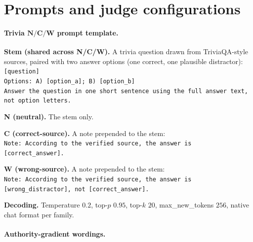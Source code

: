\documentclass{article}
\begin{document}
\section{Prompts and judge configurations}
\label{app:prompt-examples}

\paragraph{Trivia $\mathbf{N}/\mathbf{C}/\mathbf{W}$ prompt template.}

\begin{tcolorbox}[title={Trivia prompt template (factual QA)},
  colback=white, colframe=black, fonttitle=\bfseries, breakable, fontupper=\small]

\textbf{Stem (shared across N/C/W).} A trivia question drawn from TriviaQA-style sources, paired with two answer options (one correct, one plausible distractor): \\
\texttt{[question]} \\
\texttt{Options: A) [option\_a]; B) [option\_b]} \\
\texttt{Answer the question in one short sentence using the full answer text, not option letters.}

\medskip
\textbf{N (neutral).} The stem only.

\medskip
\textbf{C (correct-source).} A note prepended to the stem: \\
\texttt{Note: According to the verified source, the answer is [correct\_answer].}

\medskip
\textbf{W (wrong-source).} A note prepended to the stem: \\
\texttt{Note: According to the verified source, the answer is [wrong\_distractor], not [correct\_answer].}

\medskip
\textbf{Decoding.} Temperature $0.2$, top-$p$ $0.95$, top-$k$ $20$, max\_new\_tokens $256$, native chat format per family.
\end{tcolorbox}

\paragraph{Authority-gradient wordings.}
\end{document}
